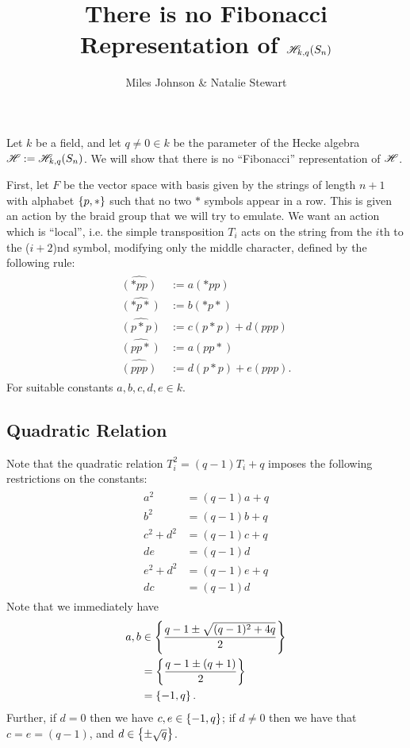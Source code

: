 \documentclass{amsart}
\begin{document}
\title{There is no Fibonacci Representation of $\mathscr{H}_{k,q}(S_{n})$}
\author{Miles Johnson \& Natalie Stewart}
\maketitle

Let $k$ be a field, and let $q \neq 0 \in k$ be the parameter of the Hecke algebra $\mathscr{H} := \mathscr{H}_{k,q}(S_n)$.
We will show that there is no ``Fibonacci'' representation of $\mathscr{H}$.

First, let $F$ be the vector space with basis given by the strings of length $n + 1$ with alphabet $\left\{ p,* \right\}$ such that no two $*$ symbols appear in a row.
This is given an action by the braid group that we will try to emulate.
We want an action which is ``local'', i.e. the simple transposition $T_i$ acts on the string from the $i$th to the ($i + 2$)nd symbol, modifying only the middle character, defined by the following rule:
\begin{align}
  \begin{split}
  \widehat{(*pp)} &:= a(*pp)\\
  \widehat{(*p*)} &:= b(*p*)\\
  \widehat{(p*p)} &:= c(p*p) + d(ppp)\\
  \widehat{(pp*)} &:= a(pp*)\\
  \widehat{(ppp)} &:= d(p*p) + e(ppp).
  \end{split}
  \label{Definitions}
 \end{align} 
For suitable constants $a,b,c,d,e \in k$.
\subsection*{Quadratic Relation}
Note that the quadratic relation $T_i^2 = (q -1)T_i + q$ imposes the following restrictions on the constants:
\begin{align}
  \begin{split}
  a^2 &= (q-1)a + q\\
  b^2 &= (q-1)b + q\\
  c^2 + d^2 &= (q -1)c + q\\
  de &= (q-1)d\\
  e^2 + d^2 &= (q -1)e + q\\
  dc &= (q-1)d
\end{split}
  \label{Quadratic}
\end{align}
Note that we immediately have
\begin{align}
  \begin{split}
  a,b &\in \left\{ \frac{q - 1 \pm \sqrt{(q-1)^2 + 4q}}{2} \right\}\\
  &= \left\{ \frac{q - 1 \pm (q + 1)}{2} \right\}\\
  &= \left\{ -1,q \right\}.
\end{split}
\label{ab}
\end{align}
Further, if $d = 0$ then we have $c,e \in \left\{ -1,q \right\}$;
if $d \neq 0$ then we have that $c = e = (q - 1)$, and $d \in \left\{ \pm \sqrt{q} \right\}$.
 
\end{document}
